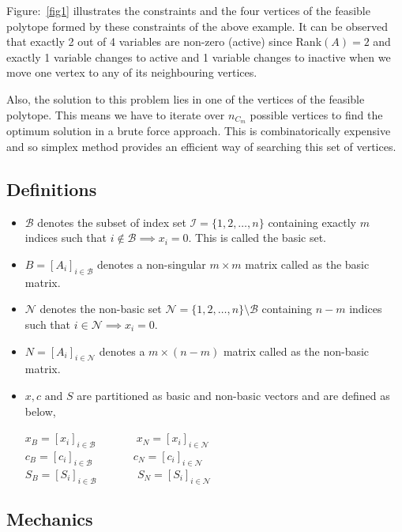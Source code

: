 \documentclass[12pt,letterpaper]{article}
\begin{document}
Figure:~\ref{fig1} illustrates the constraints and the four vertices of the feasible polytope formed by these constraints of the above example. It can be observed that exactly 2 out of 4 variables are non-zero (active) since Rank$(A)=2$ and exactly 1 variable changes to active and 1 variable changes to inactive when we move one vertex to any of its neighbouring vertices.

Also, the solution to this problem lies in one of the vertices of the feasible polytope. This means we have to iterate over $n_{C_m}$ possible vertices to find the optimum solution in a brute force approach. This is combinatorically expensive and so simplex method provides an efficient way of searching this set of vertices.

\subsection{Definitions}
\label{def}

\begin{itemize}
	\item $\mathcal{B}$ denotes the subset of index set $\mathcal{I} = \{1,2,\dots,n\}$ containing exactly $m$ indices such that $i \notin \mathcal{B} \implies x_i = 0$. This is called the basic set.
	\item $B = [A_i]_{i \in \mathcal{B}}$ denotes a non-singular $m\times m$ matrix called as the basic matrix.
	\item $\mathcal{N}$ denotes the non-basic set $\mathcal{N} = \{1,2,\dots,n\}\setminus\mathcal{B}$ containing $n-m$ indices such that $i \in \mathcal{N} \implies x_i = 0$.
	\item $N = [A_i]_{i \in \mathcal{N}}$ denotes a $m\times (n-m)$ matrix called as the non-basic matrix.
	\item $x, c \text{ and } S$ are partitioned as basic and non-basic vectors and are defined as below,
	      \begin{center}
				$x_B = [x_i]_{i \in \mathcal{B}}$ ~~~~~~ $x_N = [x_i]_{i \in \mathcal{N}}$ \\
				$c_B = [c_i]_{i \in \mathcal{B}}$ ~~~~~~ $c_N = [c_i]_{i \in \mathcal{N}}$ \\
				$S_B = [S_i]_{i \in \mathcal{B}}$ ~~~~~~ $S_N = [S_i]_{i \in \mathcal{N}}$ \\
	      \end{center}		  
\end{itemize}

\subsection{Mechanics}
\end{document}
